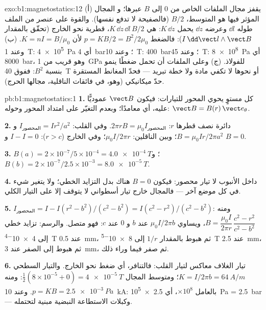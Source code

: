 \begin{solution}{exo:b1:magnetostatics:12}
(أ) يقفز مجال الملفات الخاص من $0$ إلى $B$ عبرها؛ و
المجال المؤثر فيها هو المتوسط، $B/2$ (فالصفيحة لا تدفع
نفسها). والقوة على عنصر من الملف طوله $\dd l$ وعرضه $\dd z$
يحمل $K\,\dd z$: هي $K\,\dd z\,\dd l\,B/2$، قطرية نحو الخارج (تحقّق بالمقدار $I\,\dd\vect l
\wedge\vect B$): فالضغط $p = KB/2 = B^2/2\mu_0$ لأن $K = nI = B/\mu_0$.
(ب) وعند \qty{1}{T}: \qty{4e5}{Pa} أي \qty{4}{bar}؛ وعند \qty{10}{T}: \qty{400}{bar}؛ وعند \qty{45}{T}:
\qty{8e8}{Pa} أي \qty{8000}{bar}، وهو قريب من \qty{1}{GPa} للفولاذ. (ج) وعلى
الملفات أن تحمل ضغطًا ينمو بنسبة $B^2$: ففوق \qty{40}{T} أو نحوها
لا تكفي مادة ولا خطة تبريد --- فحدّ المغانط المستقرة
حدّ ميكانيكي (وهو، في فائقات الناقلية، مجالها الحرج).
\end{solution}

\begin{solution}{pb:b1:magnetostatics:1}
\textbf{1.} كل مستوٍ يحوي المحور 
للتيارات: فيكون $\vect B$ عموديًّا عليه، أي معامدًا؛ وبعدم التغيّر
على امتداد المحور وحوله: $\vect B = B(r)\,\vect e_\theta$.

\textbf{2.} دائرة نصف قطرها $r$: $2\pi rB = \mu_0I_{\text{المحصور}}$. وفي القلب:
$I_{\text{المحصور}} = Ir^2/a^2$ و $B = \mu_0Ir/2\pi a^2$؛ وبين الناقلين: $\mu_0I/2\pi r$؛
وفي الخارج ($r > c$): $I - I = 0$ و $B = 0$.

\textbf{3.} $B(a) = 2 \times 10^{-7}/5 \times 10^{-4} = \qty{4.0e-4}{T}$؛ و $B(b) = 2 \times
10^{-7}/2.5 \times 10^{-3} = \qty{8.0e-5}{T}$.

\textbf{4.} داخل الأنبوب لا تيار محصور: فيكون $B = 0$ هناك بدل
التزايد الخطي؛ ولا يتغير شيء في كل موضع آخر --- فالمجال خارج
تيار أسطواني لا يتوقف إلا على التيار الكلي.

\textbf{5.} $I_{\text{المحصور}} = I - I(r^2 - b^2)/(c^2 - b^2) = I(c^2 - r^2)/(c^2 -
b^2)$: ومنه $B = \dfrac{\mu_0I}{2\pi r}\,\dfrac{c^2 - r^2}{c^2 - b^2}$، ويساوي $\mu_0I/2\pi b$ عند
$b$ و $0$ عند $c$: فهو متصل. والرسم: تزايد خطي إلى \qty{4e-4}{T} عند
\qty{0.5}{mm}، ثم هبوط بالمقدار $1/r$ إلى \qty{8e-5}{T} عند \qty{2.5}{mm}، ثم هبوط إلى الصفر عند
\qty{3}{mm}، ثم صفر فيما وراء ذلك.

\textbf{6.} تيار الغلاف معاكس لتيار القلب: فالتنافر،
أي ضغط نحو الخارج. والتيار السطحي $K = I/2\pi b = \qty{64}{A/m}$؛ ومتوسط المجال
$\tfrac12(8 \times 10^{-5} + 0) = \qty{4e-5}{T}$: ومنه $p = KB = \qty{2.5e-3}{Pa}$. وعند
\qty{10}{kA}: بالعامل $\times10^8$، أي \qty{2.5e5}{Pa} = \qty{2.5}{bar} --- وكبلات
الاستطاعة النبضية مبنية لتحتمله.


\end{solution}
